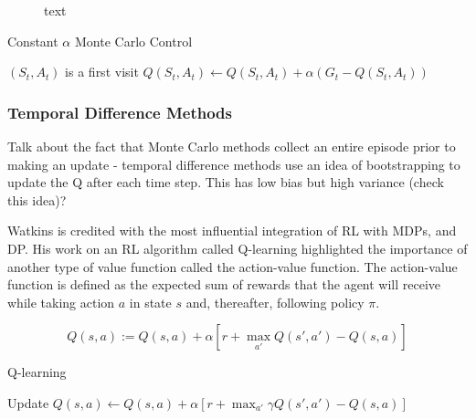 \begin{figure}[h]
	\centering
	
	\caption{text}
	\label{fig:210_monte_carlo_methods}
\end{figure}

\begin{algorithm}[h]
	\caption{Constant $\alpha$ Monte Carlo Control}
	\label{alg:01_monte_carlo}
	\begin{algorithmic}[1]
				\If $(S_t, A_t)$ is a first visit
					$Q(S_t, A_t) \gets Q(S_t, A_t) + \alpha(G_t - Q(S_t, A_t))$
				\EndIf
			\EndFor
		\EndFor
	\end{algorithmic}
\end{algorithm}



\subsubsection{Temporal Difference Methods}
Talk about the fact that Monte Carlo methods collect an entire episode prior to making an update - temporal difference methods use an idea of bootstrapping to update the Q after each time step. This has low bias but high variance (check this idea)?


Watkins is credited with the most influential integration of RL with MDPs, and DP. His work on an RL algorithm called Q-learning highlighted the importance of another type of value function called the action-value function. The action-value function is defined as the expected sum of rewards that the agent will receive while taking action $a$ in state $s$ and, thereafter, following policy $\pi$.

\begin{equation}
	Q(s,a) := Q(s,a) + \alpha[r + \max_{a'}Q(s',a') - Q(s,a)]
\end{equation}

\begin{algorithm}[h]
	\caption{Q-learning}
	\label{alg:02_q_learning}
	\begin{algorithmic}[1]
		\Repeat
				\State Update {$Q(s,a) \gets Q(s,a) + \alpha[r + \max_{a'} \gamma Q(s',a') - Q(s,a)]$}
			\EndFor
	\end{algorithmic}
\end{algorithm}


